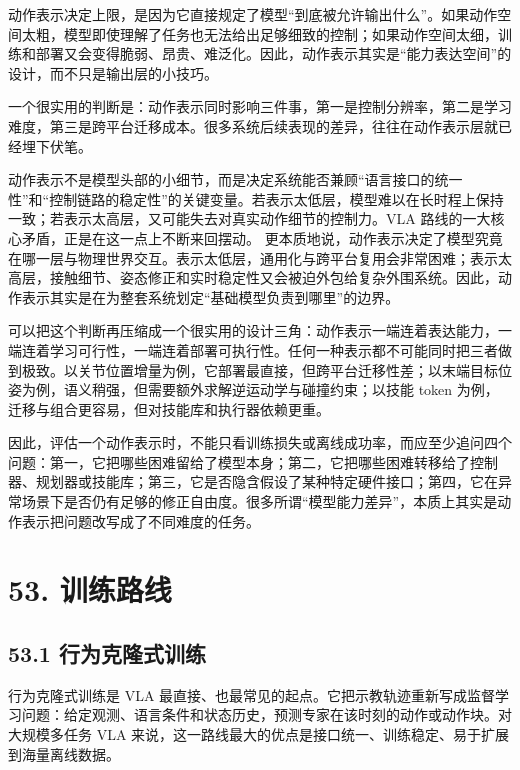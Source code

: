 动作表示决定上限，是因为它直接规定了模型“到底被允许输出什么”。如果动作空间太粗，模型即使理解了任务也无法给出足够细致的控制；如果动作空间太细，训练和部署又会变得脆弱、昂贵、难泛化。因此，动作表示其实是“能力表达空间”的设计，而不只是输出层的小技巧。

一个很实用的判断是：动作表示同时影响三件事，第一是控制分辨率，第二是学习难度，第三是跨平台迁移成本。很多系统后续表现的差异，往往在动作表示层就已经埋下伏笔。

动作表示不是模型头部的小细节，而是决定系统能否兼顾“语言接口的统一性”和“控制链路的稳定性”的关键变量。若表示太低层，模型难以在长时程上保持一致；若表示太高层，又可能失去对真实动作细节的控制力。VLA 路线的一大核心矛盾，正是在这一点上不断来回摆动。 更本质地说，动作表示决定了模型究竟在哪一层与物理世界交互。表示太低层，通用化与跨平台复用会非常困难；表示太高层，接触细节、姿态修正和实时稳定性又会被迫外包给复杂外围系统。因此，动作表示其实是在为整套系统划定“基础模型负责到哪里”的边界。

可以把这个判断再压缩成一个很实用的设计三角：动作表示一端连着表达能力，一端连着学习可行性，一端连着部署可执行性。任何一种表示都不可能同时把三者做到极致。以关节位置增量为例，它部署最直接，但跨平台迁移性差；以末端目标位姿为例，语义稍强，但需要额外求解逆运动学与碰撞约束；以技能 token 为例，迁移与组合更容易，但对技能库和执行器依赖更重。

因此，评估一个动作表示时，不能只看训练损失或离线成功率，而应至少追问四个问题：第一，它把哪些困难留给了模型本身；第二，它把哪些困难转移给了控制器、规划器或技能库；第三，它是否隐含假设了某种特定硬件接口；第四，它在异常场景下是否仍有足够的修正自由度。很多所谓“模型能力差异”，本质上其实是动作表示把问题改写成了不同难度的任务。

\section*{53. 训练路线}

\subsection*{53.1 行为克隆式训练}


行为克隆式训练是 VLA 最直接、也最常见的起点。它把示教轨迹重新写成监督学习问题：给定观测、语言条件和状态历史，预测专家在该时刻的动作或动作块。对大规模多任务 VLA 来说，这一路线最大的优点是接口统一、训练稳定、易于扩展到海量离线数据。

